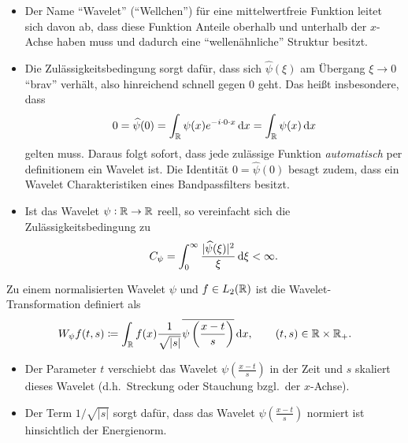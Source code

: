 \begin{remark} \leavevmode
\begin{itemize}
\item Der Name \enquote{Wavelet} (\enquote{Wellchen}) für eine mittelwertfreie Funktion leitet sich
  davon ab, dass diese Funktion Anteile oberhalb und unterhalb der $ x $-Achse haben muss und 
  dadurch eine \enquote{wellenähnliche} Struktur besitzt.
\item Die Zulässigkeitsbedingung sorgt dafür, dass sich $ \widehat{\psi}(\xi) $ am Übergang
  $ \xi \to 0 $ \enquote{brav} verhält, also hinreichend schnell gegen $ 0 $ geht. Das heißt
  insbesondere, dass
  \[
    0 = \widehat{\psi}(0) = \int_{\R} \psi(x) e^{-i \cdot 0 \cdot x} \dif x = \int_{\R} \psi(x) 
    \dif x
  \]
  gelten muss. Daraus folgt sofort, dass jede zulässige Funktion \emph{automatisch} per definitionem
  ein Wavelet ist. Die Identität $ 0 = \widehat{\psi}(0) $ besagt zudem, dass ein Wavelet
  Charakteristiken eines Bandpassfilters besitzt.
\item Ist das Wavelet $ \psi : \mathbb{R} \rightarrow \mathbb{R} $ reell, so vereinfacht sich die 
  Zulässigkeitsbedingung zu
  \[
    C_{\psi} = \int_{0}^{\infty} \frac{|\widehat{\psi}(\xi)|^{2}}{\xi} \dif \xi < \infty.
  \]
\end{itemize}
\end{remark}

\begin{definition}
Zu einem normalisierten Wavelet $ \psi $ und $ f \in L_{2}(\mathbb{R}) $ ist die Wavelet-Transformation
definiert als
\[
  W_{\psi}f(t, s) \coloneqq
  \int_{\R} f(x) \frac{1}{\sqrt{|s|}} \overline{\psi\left(\frac{x - t}{s}\right)} \dif x, \qquad
    (t,s) \in \R \times \R_{+}.
\]
\end{definition}

\begin{remark} \leavevmode
\begin{itemize}
\item Der Parameter $ t $ verschiebt das Wavelet $ \psi\left(\frac{x - t}{s}\right) $ in der Zeit
  und $ s $ skaliert dieses Wavelet (d.h.\ Streckung oder Stauchung bzgl.\ der $ x $-Achse).
\item Der Term $ 1 / \sqrt{|s|} $ sorgt dafür, dass das Wavelet $ \psi\left(\frac{x - t}{s}\right) $
  normiert ist hinsichtlich der Energienorm.
\end{itemize}
\end{remark}

